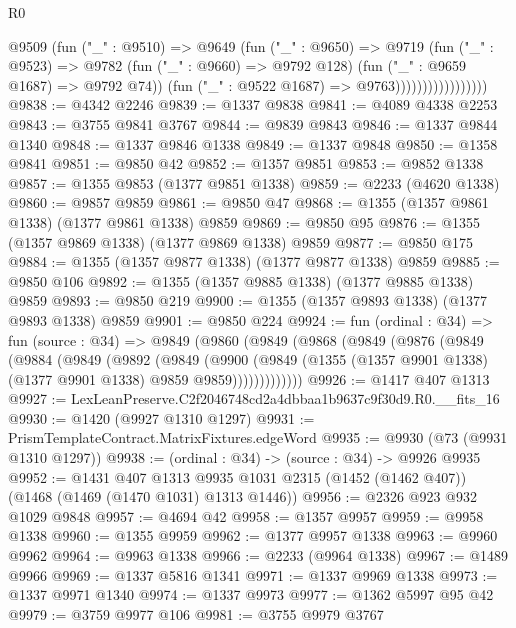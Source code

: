 \begin{lexlean}{R0}
\begin{coremodule}
                              @9509
                                (fun ("_" : @9510) =>
                                @9649
                                  (fun ("_" : @9650) =>
                                  @9719
                                    (fun ("_" : @9523) =>
                                    @9782
                                      (fun ("_" : @9660) => @9792 @128)
                                      (fun ("_" : @9659 @1687) => @9792 @74))
                                    (fun ("_" : @9522 @1687) => @9763)))))))))))))))))
@9838 := @4342 @2246
@9839 := @1337 @9838
@9841 := @4089 @4338 @2253
@9843 := @3755 @9841 @3767
@9844 := @9839 @9843
@9846 := @1337 @9844 @1340
@9848 := @1337 @9846 @1338
@9849 := @1337 @9848
@9850 := @1358 @9841
@9851 := @9850 @42
@9852 := @1357 @9851
@9853 := @9852 @1338
@9857 := @1355 @9853 (@1377 @9851 @1338)
@9859 := @2233 (@4620 @1338)
@9860 := @9857 @9859
@9861 := @9850 @47
@9868 := @1355 (@1357 @9861 @1338) (@1377 @9861 @1338) @9859
@9869 := @9850 @95
@9876 := @1355 (@1357 @9869 @1338) (@1377 @9869 @1338) @9859
@9877 := @9850 @175
@9884 := @1355 (@1357 @9877 @1338) (@1377 @9877 @1338) @9859
@9885 := @9850 @106
@9892 := @1355 (@1357 @9885 @1338) (@1377 @9885 @1338) @9859
@9893 := @9850 @219
@9900 := @1355 (@1357 @9893 @1338) (@1377 @9893 @1338) @9859
@9901 := @9850 @224
@9924 := fun (ordinal : @34) =>
  fun (source : @34) =>
  @9849
    (@9860
      (@9849
        (@9868
          (@9849
            (@9876
              (@9849
                (@9884
                  (@9849
                    (@9892
                      (@9849
                        (@9900
                          (@9849
                            (@1355 (@1357 @9901 @1338) (@1377 @9901 @1338) @9859 @9859)))))))))))))
@9926 := @1417 @407 @1313
@9927 := LexLeanPreserve.C2f2046748cd2a4dbbaa1b9637c9f30d9.R0.__fits_16
@9930 := @1420 (@9927 @1310 @1297)
@9931 := PrismTemplateContract.MatrixFixtures.edgeWord
@9935 := @9930 (@73 (@9931 @1310 @1297))
@9938 := (ordinal : @34) -> (source : @34) -> @9926 @9935
@9952 := @1431
    @407
    @1313
    @9935
    @1031
    @2315
    (@1452 (@1462 @407))
    (@1468 (@1469 (@1470 @1031) @1313 @1446))
@9956 := @2326 @923 @932 @1029 @9848
@9957 := @4694 @42
@9958 := @1357 @9957
@9959 := @9958 @1338
@9960 := @1355 @9959
@9962 := @1377 @9957 @1338
@9963 := @9960 @9962
@9964 := @9963 @1338
@9966 := @2233 (@9964 @1338)
@9967 := @1489 @9966
@9969 := @1337 @5816 @1341
@9971 := @1337 @9969 @1338
@9973 := @1337 @9971 @1340
@9974 := @1337 @9973
@9977 := @1362 @5997 @95 @42
@9979 := @3759 @9977 @106
@9981 := @3755 @9979 @3767

\end{coremodule}
\end{lexlean}
